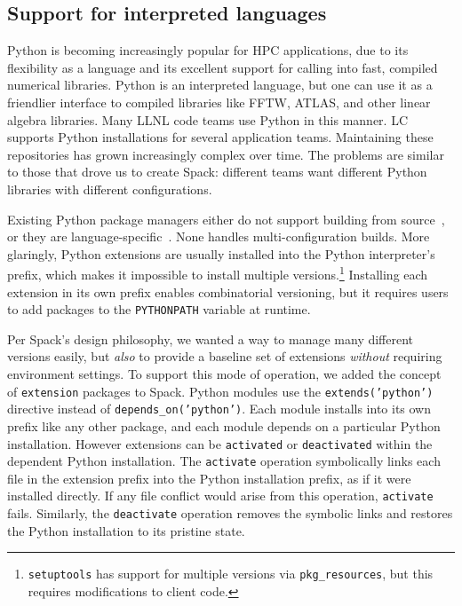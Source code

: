 
\subsection{Support for interpreted languages}
\label{sec:usecase-python}

Python is becoming increasingly popular for HPC applications,
due to its flexibility as a language and its excellent support
for calling into fast, compiled numerical libraries.
Python is an interpreted language, but one can use it
as a friendlier interface to compiled libraries like FFTW, ATLAS, and
other linear algebra libraries.  Many LLNL code teams use Python in this manner.
%
LC supports Python installations for several application teams.
Maintaining these repositories has grown increasingly complex over
time. The problems are similar to those that drove us to create
Spack: different teams want different Python libraries with different
configurations.

Existing Python package managers either do not support building from
source~\cite{anaconda,conda}, or they are language-specific~\cite{eby:setuptools}.
None handles multi-configuration builds.  More glaringly, Python extensions
are usually installed into the Python interpreter's prefix, which makes it 
impossible to install multiple versions.\footnote{{\tt setuptools}
has support for multiple versions via {\tt pkg_resources},
but this requires modifications to client code.}
Installing each extension in its own prefix enables combinatorial versioning,
but it requires users to add packages to the {\tt PYTHONPATH} variable at runtime.

Per Spack's design philosophy, we wanted a way to manage many different
versions easily, but {\it also} to provide a baseline set of extensions 
{\it without} requiring environment settings.
%
To support this mode of operation, we added the concept of {\tt extension} packages
to Spack. Python modules use the {\tt extends('python')} directive instead of
{\tt depends\_on('python')}.
Each module installs into its own prefix like any other package,
and each module depends on a particular Python installation.
However extensions can be {\tt activated} or {\tt deactivated}
within the dependent Python installation.  The {\tt activate} operation
symbolically links each file in the extension prefix into the Python
installation prefix, as if it were installed directly. If any file
conflict would arise from this operation, {\tt activate} fails.
Similarly, the {\tt deactivate} operation removes the symbolic links and restores
the Python installation to its  pristine state.

